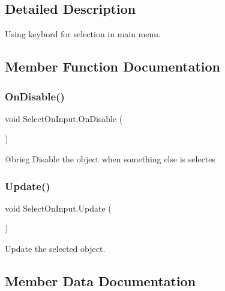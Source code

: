 \subsection{Detailed Description}
Using keybord for selection in main menu. 

\subsection{Member Function Documentation}
\mbox{\label{class_select_on_input_a091beca3bb995b8408358b1949d526aa}} 
\subsubsection{\texorpdfstring{OnDisable()}{OnDisable()}}
{\footnotesize\ttfamily void Select\+On\+Input.\+On\+Disable (\begin{DoxyParamCaption}{ }\end{DoxyParamCaption})\hspace{0.3cm}{\ttfamily [private]}}

@brieg Disable the object when something else is selectes \mbox{\label{class_select_on_input_a3ffd4bde4e9564050cbe707c8c75d17a}} 
\subsubsection{\texorpdfstring{Update()}{Update()}}
{\footnotesize\ttfamily void Select\+On\+Input.\+Update (\begin{DoxyParamCaption}{ }\end{DoxyParamCaption})\hspace{0.3cm}{\ttfamily [private]}}



Update the selected object. 



\subsection{Member Data Documentation}
\mbox{\label{class_select_on_input_a32ff6bfbb80619aed84e0e66ee1094ab}} 

